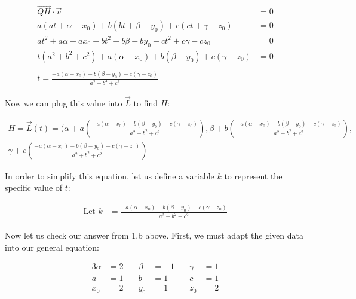 \documentclass{article}
\begin{document}
\begin{align*}
\vec{QH} \cdot \vec{v} &= 0 \\
a(at + \alpha - x_0) + b(bt + \beta - y_0) + c(ct + \gamma - z_0) &= 0 \\
at^2 + a\alpha - ax_0 + bt^2 + b\beta - by_0 + ct^2 + c\gamma - cz_0 &= 0 \\
t(a^2 + b^2 + c^2) + a(\alpha - x_0) + b(\beta - y_0) + c(\gamma - z_0) &= 0 \\
\\
t = \frac{-a(\alpha - x_0) - b(\beta - y_0) - c(\gamma - z_0)}{a^2+b^2+c^2}
\end{align*}

\begin{text}
\indent Now we can plug this value into $\vec{L}$ to find $H$:
\end{text}

\begin{equation*}
\begin{multlined}
H = \vec{L}(t) = (\alpha + a(\frac{-a(\alpha - x_0) - b(\beta - y_0) - c(\gamma - z_0)}{a^2+b^2+c^2}), \beta + b(\frac{-a(\alpha - x_0) - b(\beta - y_0) - c(\gamma - z_0)}{a^2+b^2+c^2}), \\\gamma + c(\frac{-a(\alpha - x_0) - b(\beta - y_0) - c(\gamma - z_0)}{a^2+b^2+c^2})
\end{multlined}
\end{equation*}

\begin{text}
\indent In order to simplify this equation, let us define a variable $k$ to represent the specific value of $t$:
\end{text}

\begin{align*}
\text{Let } k &= \frac{-a(\alpha - x_0) - b(\beta - y_0) - c(\gamma - z_0)}{a^2+b^2+c^2}
\end{align*}

\begin{text}
\newline
\indent Now let us check our answer from 1.b above.  First, we must adapt the given data into our general equation:
\end{text}

\begin{alignat*}{3}
\alpha &= 2 \quad & \beta &= -1 \quad & \gamma &= 1 \\
a &= 1    \quad & b &= 1    \quad & c &= 1\\
x_0 &= 2    \quad & y_0 &= 1  \quad & z_0 &= 2
\end{alignat*}
\end{document}
